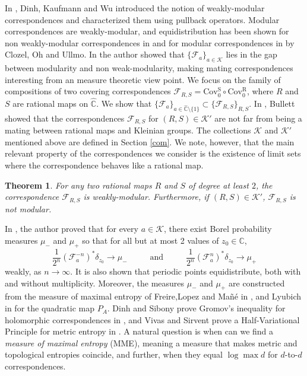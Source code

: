 \documentclass[11pt,letterpaper]{article}
\newtheorem{theorem}{Theorem}[section]
\theoremstyle{definition}
\def\covr{\operatorname{Cov^R_0}}
\def\covs{\operatorname{Cov^S_0}}
\def\F{\mathcal{F}_a}
\begin{document}


In \cite{DinKauWu20}, Dinh, Kaufmann and Wu introduced the notion of weakly-modular correspondences and characterized them using pullback operators. Modular correspondences are weakly-modular, and equidistribution has been shown for non weakly-modular correspondences in \cite{DinKauWu20} and for modular correspondences in \cite{CloOhUll01} by Clozel, Oh and Ullmo. In \cite{Mat23} the author showed that $\lbrace\F\rbrace_{a\in\mathcal{K}}$ lies in the gap between modularity and non weak-modularity, making mating correspondences interesting from an measure theoretic view point. We focus on the family of compositions of two covering correspondences $\mathcal{F}_{R,S}=\covs\circ\covr$, where $R$ and $S$ are rational maps on $\widehat{\mathbb{C}}$. We show that $\lbrace\F\rbrace_{a\in\widehat{\mathbb{C}}\setminus\lbrace 1\rbrace}\subset\lbrace \mathcal{F}_{R,S}\rbrace_{R,S}$. In \cite{Bul00}, Bullett showed that the correspondences $\mathcal{F}_{R,S}$ for $(R,S)\in\mathcal{K}'$ are not far from being a mating between rational maps and Kleinian groups. The collections $\mathcal{K}$ and $\mathcal{K'}$ mentioned above are defined in Section \ref{com}. We note, however, that the main relevant property of the correspondences we consider is the existence of limit sets where the correspondence behaves like a rational map.

\begin{theorem}\label{B}
For any two rational maps $R$ and $S$ of degree at least $2$, the correspondence $\mathcal{F}_{R,S}$ is weakly-modular. Furthermore, if $(R,S)\in\mathcal{K}'$, $\mathcal{F}_{R,S}$ is not modular.
\end{theorem} %
In \cite{Mat23}, the author proved that for every $a\in\mathcal{K}$, there exist Borel probability measures $\mu_-$ and $\mu_+$ so that for all but at most 2 values of $z_0\in\mathbb{C}$,
$$\frac{1}{2^n}(\F^{-n})^*\delta_{z_0}\to\mu_-\hspace{1cm}\mbox{ and }\hspace{1cm}\frac{1}{2^n}(\F^n)^*\delta_{z_0}\to\mu_+$$
weakly, as $n\to\infty$. It is also shown that periodic points equidistribute, both with and without multiplicity. Moreover, the measures $\mu_-$ and $\mu_+$ are constructed from the measure of maximal entropy of Freire,Lopez and Ma\~n\'e in \cite{FreLopMan83}, and Lyubich in \cite{Lju83} for the quadratic map $P_A$. Dinh and Sibony prove Gromov's inequality for holomorphic correspondences in \cite{DinSib08II}, and Vivas and Sirvent prove a Half-Variational Principle for metric entropy in \cite{VivSir22}. A natural question is when can we find a \emph{measure of maximal entropy} (MME), meaning a measure that makes metric and topological entropies coincide, and further, when they equal $\log\max d$ for $d$-to-$d$ correspondences.
\end{document}

